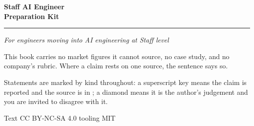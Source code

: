 \thispagestyle{empty}
\begin{center}
\vspace*{3cm}
{\Huge\bfseries\color{kitink} Staff AI Engineer\\[6pt] Preparation Kit\par}
\vspace{10pt}
{\color{kitink}\rule{0.6\linewidth}{1.2pt}\par}
\vspace{14pt}
{\Large\itshape For engineers moving into AI engineering at Staff level\par}
\vfill
{\small
This book carries no market figures it cannot source, no case study, and no
company's rubric. Where a claim rests on one source, the sentence says so.\par
\vspace{8pt}
Statements are marked by kind throughout: a superscript key means the claim is
reported and the source is in ; a diamond means it is the
author's judgement and you are invited to disagree with it.\par}
\vspace{18pt}
{\small\color{kitgrey} Text CC BY-NC-SA 4.0 \dash{} tooling MIT\par}
\vspace{2cm}
\end{center}
\clearpage
